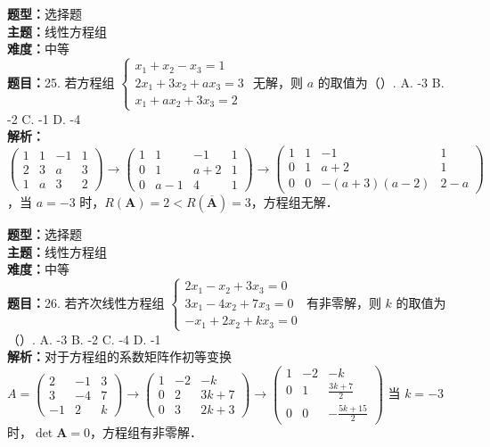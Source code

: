 \documentclass{ctexart}
\newenvironment{question}[5]{%
	\noindent\textbf{题型：}#1\\
	\textbf{主题：}#2\\
	\textbf{难度：}#3\\
	\textbf{题目：}#4\\
	\textbf{解析：}#5\\
	\vspace{1em}
}{}
\begin{document}
	\begin{question}
		{选择题}
		{线性方程组}
		{中等}
		{25. 若方程组 \(\left\{\begin{array}{l}x_1+x_2-x_3=1 \\ 2 x_1+3 x_2+a x_3=3 \\ x_1+a x_2+3 x_3=2\end{array}\right.\) 无解，则 \(a\) 的取值为（）.
			A. -3
			B. -2
			C. -1
			D. -4}
		{\(\left(\begin{array}{cccc}1 & 1 & -1 & 1 \\ 2 & 3 & a & 3 \\ 1 & a & 3 & 2\end{array}\right) \rightarrow\left(\begin{array}{cccc}1 & 1 & -1 & 1 \\ 0 & 1 & a+2 & 1 \\ 0 & a-1 & 4 & 1\end{array}\right) \rightarrow\left(\begin{array}{cccc}1 & 1 & -1 & 1 \\ 0 & 1 & a+2 & 1 \\ 0 & 0 & -(a+3)(a-2) & 2-a\end{array}\right)\)，当 \(a=-3\) 时，\(R(\mathbf{A})=2<R(\overline{\mathbf{A}})=3\)，方程组无解．}
	\end{question}
	
	\begin{question}
		{选择题}
		{线性方程组}
		{中等}
		{26. 若齐次线性方程组 \(\left\{\begin{array}{l}2 x_1-x_2+3 x_3=0 \\ 3 x_1-4 x_2+7 x_3=0 \\ -x_1+2 x_2+k x_3=0\end{array}\right.\) 有非零解，则 \(k\) 的取值为（）.
			A. -3
			B. -2
			C. -4
			D. -1}
		{对于方程组的系数矩阵作初等变换 \(A=\left(\begin{array}{ccc}2 & -1 & 3 \\ 3 & -4 & 7 \\ -1 & 2 & k\end{array}\right) \rightarrow\left(\begin{array}{ccc}1 & -2 & -k \\ 0 & 2 & 3 k+7 \\ 0 & 3 & 2 k+3\end{array}\right) \rightarrow\left(\begin{array}{ccc}1 & -2 & -k \\ 0 & 1 & \frac{3 k+7}{2} \\ 0 & 0 & -\frac{5 k+15}{2}\end{array}\right)\) 当 \(k=-3\) 时，\(\operatorname{det} \mathbf{A}=0\)，方程组有非零解．}
	\end{question}
	
\end{document}
